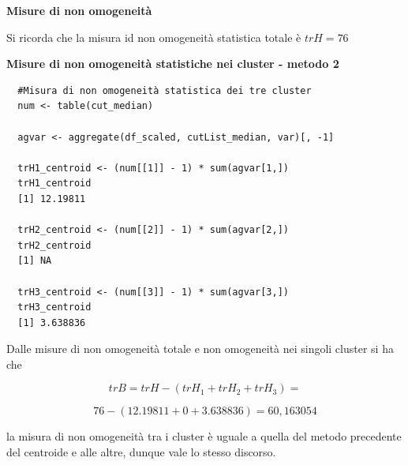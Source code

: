 \noindent \textbf{Misure di non omogeneità}

Si ricorda che la misura id non omogeneità statistica totale è $trH = 76$

\noindent \textbf{Misure di non omogeneità statistiche nei cluster - metodo 2}

\vspace{5mm}
\begin{lstlisting}
  #Misura di non omogeneità statistica dei tre cluster
  num <- table(cut_median)

  agvar <- aggregate(df_scaled, cutList_median, var)[, -1]

  trH1_centroid <- (num[[1]] - 1) * sum(agvar[1,])
  trH1_centroid
  [1] 12.19811

  trH2_centroid <- (num[[2]] - 1) * sum(agvar[2,])
  trH2_centroid
  [1] NA

  trH3_centroid <- (num[[3]] - 1) * sum(agvar[3,])
  trH3_centroid
  [1] 3.638836

\end{lstlisting}
\vspace{5mm}

Dalle misure di non omogeneità totale e non omogeneità nei singoli cluster si ha che

\[trB = trH - (trH_1 + trH_2 + trH_3) = \]

\[76 - (12.19811 + 0 + 3.638836) = 60,163054\]

\noindent la misura di non omogeneità tra i cluster è uguale a quella del metodo precedente del centroide e alle altre, dunque vale lo stesso discorso.


\newpage